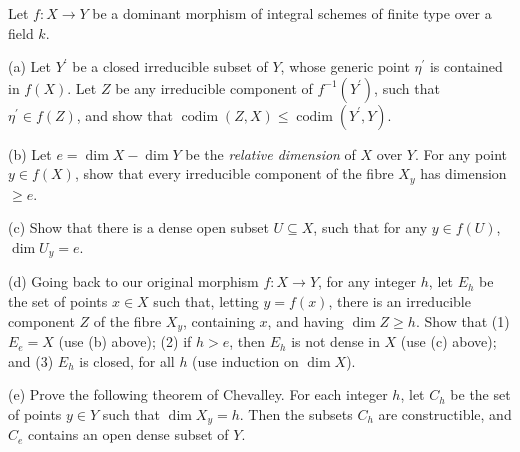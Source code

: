 \begin{exe}
	\label{2.3.22}
	Let $f: X \rightarrow Y$ be a dominant morphism of integral schemes of finite type over a field $k$.
	
	(a) Let $Y^{\prime}$ be a closed irreducible subset of $Y$, whose generic point $\eta^{\prime}$ is contained in $f(X)$. Let $Z$ be any irreducible component of $f^{-1}(Y^{\prime})$, such that $\eta^{\prime} \in f(Z)$, and show that $\operatorname{codim}(Z, X) \leq \operatorname{codim}(Y^{\prime}, Y)$.
	
	(b) Let $e=\dim X-\dim Y$ be the \emph{relative dimension} of $X$ over $Y$. For any point $y \in f(X)$, show that every irreducible component of the fibre $X_{y}$ has dimension $\geq e$.
	
	(c) Show that there is a dense open subset $U \subseteq X$, such that for any $y \in f(U)$, $\dim U_{y}=e$.
	
	(d) Going back to our original morphism $f: X \rightarrow Y$, for any integer $h$, let $E_{h}$ be the set of points $x \in X$ such that, letting $y=f(x)$, there is an irreducible component $Z$ of the fibre $X_{y}$, containing $x$, and having $\dim Z \geq h$. Show that (1) $E_{e}=X$ (use (b) above); (2) if $h>e$, then $E_{h}$ is not dense in $X$ (use (c) above); and (3) $E_{h}$ is closed, for all $h$ (use induction on $\dim X$).
	
	(e) Prove the following theorem of Chevalley. For each integer $h$, let $C_{h}$ be the set of points $y \in Y$ such that $\dim X_{y}=h$. Then the subsets $C_{h}$ are constructible, and $C_{e}$ contains an open dense subset of $Y$.
\end{exe}
